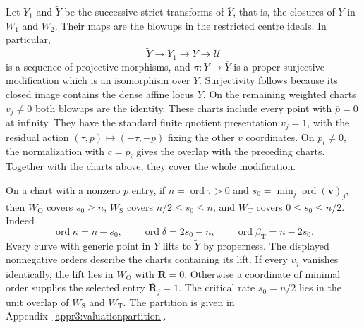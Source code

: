 \documentclass[11pt,a4paper]{article}
\numberwithin{equation}{section}
\theoremstyle{plain}
\theoremstyle{definition}
\theoremstyle{remark}
\begin{document}
Let $Y_1$ and $\widetilde Y$ be the successive strict transforms of
$\overline Y$, that is, the closures of $Y$ in $W_1$ and $W_2$.
Their maps are the blowups in the restricted centre ideals.
In particular,
\[
 \widetilde Y\longrightarrow Y_1\longrightarrow\overline Y
                      \longrightarrow\mathscr U
\]
is a sequence of projective morphisms, and
$\pi:\widetilde Y\to\overline Y$ is a proper surjective modification
which is an isomorphism over $Y$. Surjectivity follows because its
closed image contains the dense affine locus $Y$.
On the remaining weighted charts $v_j\ne0$ both blowups are the
identity. These charts include every point with
$\overline p=0$ at infinity. They have the standard finite quotient
presentation $v_j=1$, with the residual action
$(\tau,\overline p)\mapsto(-\tau,-\overline p)$ fixing the other
$v$ coordinates. On $\overline p_i\ne0$, the normalization with
$c=\overline p_i$ gives the overlap with the preceding charts.
Together with the charts above, they cover the whole modification.

On a chart with a nonzero $\overline p$ entry, if
$n=\operatorname{ord}\tau>0$ and
$s_0=\min_j\operatorname{ord}(\boldsymbol v)_j$, then
$W_{\mathrm O}$ covers $s_0\ge n$, $W_{\mathrm S}$ covers
$n/2\le s_0\le n$, and $W_{\mathrm T}$ covers $0\le s_0\le n/2$. Indeed
\[
 \operatorname{ord}\kappa=n-s_0,\qquad
 \operatorname{ord}\delta=2s_0-n,\qquad
 \operatorname{ord}\beta_{\mathrm T}=n-2s_0.
\]
Every curve with generic point in $Y$ lifts to $\widetilde Y$ by
properness. The displayed nonnegative orders describe the charts
containing its lift. If every $v_j$ vanishes identically, the lift
lies in $W_{\mathrm O}$ with $\boldsymbol R=0$.
Otherwise a coordinate of minimal order supplies the selected entry
$\overline{\boldsymbol R}_j=1$.
The critical rate $s_0=n/2$ lies in the unit overlap of
$W_{\mathrm S}$ and $W_{\mathrm T}$.
The partition is given in
Appendix~\ref{appr3:valuationpartition}.
\end{document}
